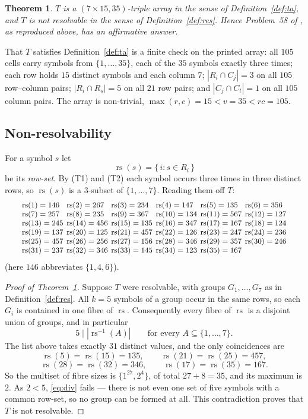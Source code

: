 \documentclass[11pt]{amsart}
\newtheorem{theorem}{Theorem}
\theoremstyle{definition}
\newcommand{\rs}{\operatorname{rs}}
\begin{document}
\begin{theorem}\label{thm:main}
$T$ is a $(7\times 15,35)$-triple array in the sense of Definition~\ref{def:ta}, and $T$ is
not resolvable in the sense of Definition~\ref{def:res}. Hence Problem~58 of \cite{GO}, as
reproduced above, has an affirmative answer.
\end{theorem}

That $T$ satisfies Definition~\ref{def:ta} is a finite check on the printed array: all
$105$ cells carry symbols from $\{1,\dots,35\}$, each of the $35$ symbols exactly three
times; each row holds $15$ distinct symbols and each column $7$; $|R_i\cap C_j|=3$ on all
$105$ row--column pairs; $|R_i\cap R_s|=5$ on all $21$ row pairs; and $|C_j\cap C_t|=1$ on
all $105$ column pairs. The array is non-trivial, $\max(r,c)=15<v=35<rc=105$.

\subsection*{Non-resolvability}
For a symbol $s$ let
\[
 \rs(s)=\{\,i : s\in R_i\,\}
\]
be its \emph{row-set}. By (T1) and (T2) each symbol occurs three times in three distinct
rows, so $\rs(s)$ is a $3$-subset of $\{1,\dots,7\}$. Reading them off $T$:
\[
{\small\setlength{\arraycolsep}{2pt}
\begin{array}{llllll}
\rs(1)=146 & \rs(2)=267 & \rs(3)=234 & \rs(4)=147 & \rs(5)=135 & \rs(6)=356\\
\rs(7)=257 & \rs(8)=235 & \rs(9)=367 & \rs(10)=134 & \rs(11)=567 & \rs(12)=127\\
\rs(13)=245 & \rs(14)=456 & \rs(15)=135 & \rs(16)=347 & \rs(17)=167 & \rs(18)=124\\
\rs(19)=137 & \rs(20)=125 & \rs(21)=457 & \rs(22)=126 & \rs(23)=247 & \rs(24)=236\\
\rs(25)=457 & \rs(26)=256 & \rs(27)=156 & \rs(28)=346 & \rs(29)=357 & \rs(30)=246\\
\rs(31)=237 & \rs(32)=346 & \rs(33)=145 & \rs(34)=123 & \rs(35)=167 &
\end{array}}
\]
(here $146$ abbreviates $\{1,4,6\}$).

\begin{proof}[Proof of Theorem~\ref{thm:main}]
Suppose $T$ were resolvable, with groups $G_1,\dots,G_7$ as in
Definition~\ref{def:res}. All $k=5$ symbols of a group occur in the same rows, so each
$G_i$ is contained in one fibre of $\rs$. Consequently every fibre of $\rs$ is a disjoint
union of groups, and in particular
\begin{equation}\label{eq:div}
 5 \mid |\rs^{-1}(A)| \qquad\text{for every } A\subseteq\{1,\dots,7\}.
\end{equation}
The list above takes exactly $31$ distinct values, and the only coincidences are
\[
 \rs(5)=\rs(15)=135,\qquad
 \rs(21)=\rs(25)=457,
\]
\[
 \rs(28)=\rs(32)=346,\qquad
 \rs(17)=\rs(35)=167 .
\]
So the multiset of fibre sizes is $\{1^{27},2^{4}\}$, of total $27+8=35$, and its maximum
is $2$. As $2<5$, \eqref{eq:div} fails --- there is not even one set of five symbols with a
common row-set, so no group can be formed at all. This contradiction proves that $T$ is not
resolvable.
\end{proof}
\end{document}
